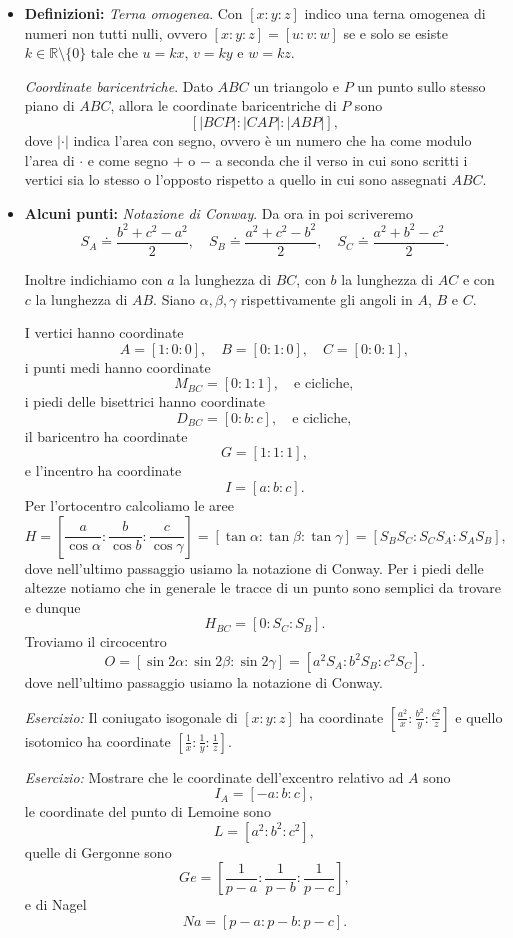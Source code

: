 \begin{itemize}
	\item \textbf{Definizioni:}
	\emph{Terna omogenea}. Con $[x:y:z]$ indico una terna omogenea di numeri non tutti nulli, ovvero $[x:y:z]=[u:v:w]$ se e solo se esiste $k\in\mathbb R\setminus\{0\}$ tale che $u=kx$, $v=ky$ e $w=kz$. 
	
	\emph{Coordinate baricentriche}. Dato $ABC$ un triangolo e $P$ un punto sullo stesso piano di $ABC$, allora le coordinate baricentriche di $P$ sono 
	$$
	[ |BCP|: |CAP|: |ABP| ],
	$$
	dove $|\cdot|$ indica l'area con segno, ovvero è un numero che ha come modulo l'area di $\cdot$ e come segno $+$ o $-$ a seconda che il verso in cui sono scritti i vertici sia lo stesso o l'opposto rispetto a quello in cui sono assegnati $ABC$. 
	\item \textbf{Alcuni punti:} 
	\emph{Notazione di Conway}. Da ora in poi scriveremo
	$$
	S_A\doteq\frac{b^2+c^2-a^2}{2}, \quad S_B\doteq\frac{a^2+c^2-b^2}{2}, \quad 
	S_C\doteq\frac{a^2+b^2-c^2}{2}.
	$$ 
	
	Inoltre indichiamo con $a$ la lunghezza di $BC$, con $b$ la lunghezza di $AC$ e con $c$ la lunghezza di $AB$. Siano $\alpha,\beta,\gamma$ rispettivamente gli angoli in $A$, $B$ e $C$.
	
	I vertici hanno coordinate 
	$$
	A=[1:0:0], \quad B=[0:1:0], \quad C=[0:0:1],
	$$
	i punti medi hanno coordinate 
	$$
	M_{BC}=[0:1:1], \quad \mbox{e cicliche},
	$$
	i piedi delle bisettrici hanno coordinate 
	$$
	D_{BC}=[0:b:c], \quad \mbox{e cicliche},
	$$
	il baricentro ha coordinate 
	$$
	G=[1:1:1],
	$$
	e l'incentro ha coordinate 
	$$
	I=[a:b:c].
	$$
	Per l'ortocentro calcoliamo le aree
	$$
	H=\left[\frac{a}{\cos\alpha}:\frac{b}{\cos b}:\frac{c}{\cos\gamma}\right]=[\tan\alpha:\tan\beta:\tan\gamma]=[S_BS_C:S_CS_A:S_AS_B],
	$$
	dove nell'ultimo passaggio usiamo la notazione di Conway. Per i piedi delle altezze notiamo che in generale le tracce di un punto sono semplici da trovare e dunque
	$$
	H_{BC}=[0:S_C:S_B].
	$$
	Troviamo il circocentro 
	$$
	O=[\sin2\alpha:\sin2\beta:\sin2\gamma]=[a^2S_A:b^2S_B:c^2S_C].
	$$
	dove nell'ultimo passaggio usiamo la notazione di Conway.
	
	\emph{Esercizio:} Il coniugato isogonale di $[x:y:z]$ ha coordinate $\left[\frac{a^2}{x}:\frac{b^2}{y}:\frac{c^2}{z}\right]$ e quello isotomico ha coordinate $\left[\frac{1}{x}:\frac{1}{y}:\frac{1}{z}\right]$. 
	
	\emph{Esercizio:} Mostrare che le coordinate dell'excentro relativo ad $A$ sono
	$$
	I_A=[-a:b:c],
	$$
	le coordinate del punto di Lemoine sono 
	$$
	L=[a^2:b^2:c^2],
	$$
	quelle di Gergonne sono 
	$$
	Ge=\left[\frac{1}{p-a}:\frac{1}{p-b}:\frac{1}{p-c}\right],
	$$
	e di Nagel 
	$$
	Na=\left[p-a:p-b:p-c\right].
	$$
	

\end{itemize}
